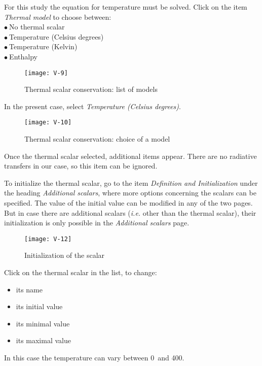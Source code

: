 \clearpage
For this study the equation for temperature must be solved. Click on the item
{\itshape Thermal model} to
choose between:\\
\hspace*{1cm}$\bullet\ $No thermal scalar\\
\hspace*{1cm}$\bullet\ $Temperature (Celsius degrees)\\
\hspace*{1cm}$\bullet\ $Temperature (Kelvin)\\
\hspace*{1cm}$\bullet\ $Enthalpy

\begin{figure}[ht]
\begin{center}
\texttt{[image: V-9]}
\caption{Thermal scalar conservation: list of models}
\label{fig11_e1}
\end{center}
\end{figure}


\clearpage
In the present case, select {\itshape Temperature (Celsius degrees)}.
\begin{figure}[ht]
\begin{center}
\texttt{[image: V-10]}
\caption{Thermal scalar conservation: choice of a model}
\label{fig12_e1}
\end{center}
\end{figure}

Once the thermal scalar selected, additional items appear.
There are no radiative transfers in our case, so this item can be ignored.

\clearpage
To initialize the thermal scalar, go to the item
{\itshape Definition and Initialization} under the heading
{\itshape Additional scalars}, where more options concerning the scalars can be
specified. The value of the initial value can be modified in any of the two
pages. But in case there are additional scalars ({\em i.e.} other than the
thermal scalar), their initialization is only possible in the {\itshape
Additional scalars} page.

\begin{figure}[ht]
\begin{center}
\texttt{[image: V-12]}
\caption{Initialization of the scalar}
\label{fig15_e1}
\end{center}
\end{figure}


\clearpage
Click on the thermal scalar in the list, to change:
\begin{itemize}
        \item its name
        \item its initial value
        \item its minimal value
        \item its maximal value
\end{itemize}
In this case the temperature can vary between 0\degresC\ and 400\degresC.

